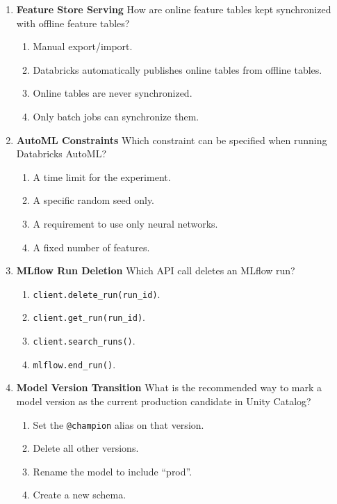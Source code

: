 \documentclass{article}
\begin{document}
\begin{enumerate}[label=\textbf{Q\arabic*.}]
		\item \textbf{Feature Store Serving}
		How are online feature tables kept synchronized with offline feature tables?
		\begin{enumerate}[label=\Alph*.]
			\item Manual export/import.
			\item Databricks automatically publishes online tables from offline tables.
			\item Online tables are never synchronized.
			\item Only batch jobs can synchronize them.
		\end{enumerate}
		
		\item \textbf{AutoML Constraints}
		Which constraint can be specified when running Databricks AutoML?
		\begin{enumerate}[label=\Alph*.]
			\item A time limit for the experiment.
			\item A specific random seed only.
			\item A requirement to use only neural networks.
			\item A fixed number of features.
		\end{enumerate}
		
		\item \textbf{MLflow Run Deletion}
		Which API call deletes an MLflow run?
		\begin{enumerate}[label=\Alph*.]
			\item \texttt{client.delete\_run(run\_id)}.
			\item \texttt{client.get\_run(run\_id)}.
			\item \texttt{client.search\_runs()}.
			\item \texttt{mlflow.end\_run()}.
		\end{enumerate}
		
		\item \textbf{Model Version Transition}
		What is the recommended way to mark a model version as the current production candidate in Unity Catalog?
		\begin{enumerate}[label=\Alph*.]
			\item Set the \texttt{@champion} alias on that version.
			\item Delete all other versions.
			\item Rename the model to include ``prod''.
			\item Create a new schema.
		\end{enumerate}
		

\end{enumerate}
\end{document}
